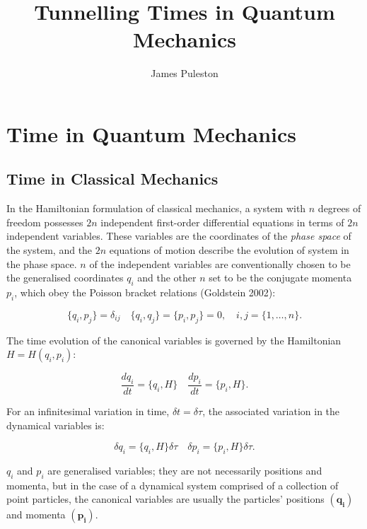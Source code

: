 \documentclass{article}
\title{Tunnelling Times in Quantum Mechanics}
\author{James Puleston}
\begin{document}
\maketitle

\section{Time in Quantum Mechanics}

\subsection{Time in Classical Mechanics}
In the Hamiltonian formulation of classical mechanics, a system with $n$ degrees of freedom possesses $2n$ independent first-order differential equations in terms of $2n$ independent variables. These variables are the coordinates of the \textit{phase space} of the system, and the $2n$ equations of motion describe the evolution of system in the phase space. $n$ of the independent variables are conventionally chosen to be the generalised coordinates $q_i$ and the other $n$ set to be the conjugate momenta $p_i$, which obey the Poisson bracket relations (Goldstein 2002):

\begin{equation}
	\{q_i, p_j\}=\delta_{ij} \quad \{q_i, q_j\}=\{p_i,p_j\}=0, \quad i,j=\{1,\dots,n\}.
	\label{conjugatevars}
\end{equation}

\noindent The time evolution of the canonical variables is governed by the Hamiltonian $H = H(q_i, p_i)$:

\begin{equation}
	\frac{dq_i}{dt} = \{q_i, H\} \quad \frac{dp_i}{dt} = \{p_i, H\}.
	\label{timeevolution}
\end{equation}

\noindent For an infinitesimal variation in time, $\delta t = \delta \tau$, the associated variation in the dynamical variables is:

\begin{equation}
	\delta q_i = \{q_i, H\}\delta\tau \quad \delta p_i = \{p_i, H\}\delta\tau.
	\label{timetranslation}
\end{equation}

\noindent $q_i$ and $p_i$ are generalised variables; they are not necessarily positions and momenta, but in the case of a dynamical system comprised of a collection of point particles, the canonical variables are usually the particles' positions $(\boldsymbol{q_i})$ and momenta $(\boldsymbol{p_i})$. 
\end{document}
